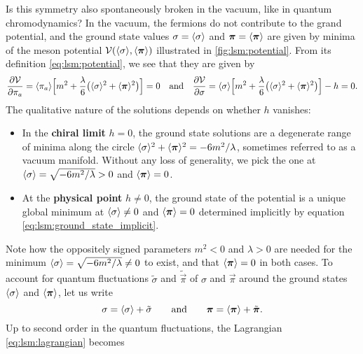 Is this symmetry also spontaneously broken in the vacuum, like in quantum chromodynamics?
In the vacuum, the fermions do not contribute to the grand potential,
and the ground state values $\sigma = \langle \sigma \rangle$ and ${\bm{\pi}} = \langle {\bm{\pi}} \rangle$
are given by minima of the meson potential $\mathcal{V}(\langle \sigma \rangle,\langle {\bm{\pi}} \rangle)$ illustrated in \cref{fig:lsm:potential}.
From its definition \eqref{eq:lsm:potential},
we see that they are given by
\begin{equation}
	\pdv{\mathcal{V}}{\pi_a} = \langle \pi_a \rangle \Big[ m^2 + \frac{\lambda}{6} \big(\langle \sigma \rangle^2 + \langle {\bm{\pi}} \rangle^2\big) \Big] = 0
	\quad \text{and} \quad
	\pdv{\mathcal{V}}{\sigma} = \langle \sigma \rangle \Big[ m^2 + \frac{\lambda}{6} \big(\langle \sigma \rangle^2 + \langle {\bm{\pi}} \rangle^2\big) \Big] - h = 0.
\label{eq:lsm:ground_state_implicit}
\end{equation}
The qualitative nature of the solutions depends on whether $h$ vanishes:
\begin{itemize}
\item In the \textbf{chiral limit} $h=0$,
      the ground state solutions are a degenerate range of minima along the circle $\langle \sigma \rangle^2+\langle {\bm{\pi}} \rangle^2=-6m^2/\lambda$,
      sometimes referred to as a vacuum manifold.
      Without any loss of generality, we pick the one at $\langle \sigma \rangle = \sqrt{-6m^2/\lambda}>0$ and $\langle {\bm{\pi}} \rangle=0$.
\item At the \textbf{physical point} $h \neq 0$,
      the ground state of the potential is a unique global minimum at $\langle \sigma \rangle \neq 0$ and $\langle {\bm{\pi}} \rangle=0$ determined implicitly by equation \eqref{eq:lsm:ground_state_implicit}.
\end{itemize}
Note how the oppositely signed parameters $m^2<0$ and $\lambda > 0$ are needed for the minimum $\langle \sigma \rangle = \sqrt{-6m^2/\lambda} \neq 0$ to exist,
and that $\langle {\bm{\pi}} \rangle = 0$ in both cases.
To account for quantum fluctuations $\tilde{\sigma}$ and $\tilde{\vec{\pi}}$ of $\sigma$ and $\vec{\pi}$ around the ground states $\langle \sigma \rangle$ and $\langle {\bm{\pi}} \rangle$,
let us write
\begin{equation}
	\sigma = \langle \sigma \rangle + \tilde{\sigma}
	\qquad \text{and} \qquad
	{\bm{\pi}} = \langle {\bm{\pi}} \rangle + \tilde{{\bm{\pi}}}.
\end{equation}
Up to second order in the quantum fluctuations,
the Lagrangian \eqref{eq:lsm:lagrangian} becomes
